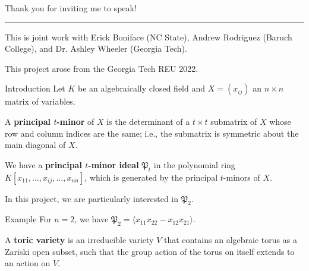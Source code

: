 \documentclass[mathserif,handout]{beamer}
\title
{\color{GTblue}{Toric varieties given by principal 2-minor ideals}}
\subtitle{Undergraduate Mathematics Research Symposium 2023}
\author[Sai Sivakumar]
{Sai Sivakumar}
\institute[Georgia Tech]{\color{GTtechgold}{University of Florida}}
\date{28 April 2023}
\newcommand{\pr}{\mathfrak P}
\begin{document}
\frame{\titlepage}

\begin{frame}{}{}
{\color{GTtechgold}Thank you for inviting me to speak!}
\vspace{0.75pc}
\hrule
\vspace{0.75pc}
This is joint work with Erick Boniface (NC State), Andrew Rodriguez (Baruch College), and Dr. Ashley Wheeler (Georgia Tech).

\vspace{0.75pc}
This project arose from the Georgia Tech REU 2022. 
\end{frame}


\begin{frame}{Introduction}
Let $K$ be an algebraically closed field and $X=(x_{ij})$ an $n\times n$ matrix of variables.


\vspace{0.75pc} 
\begin{definition}
    A \textbf{principal $t$-minor} of $X$ is the determinant of a $t\times t$ submatrix of $X$ whose row and column indices are the same; i.e., the submatrix is symmetric about the main diagonal of $X$.
\end{definition}

We have a \textbf{principal $t$-minor ideal} $\pr_t$ in the polynomial ring $K[x_{11},\dots,x_{ij},\dots,x_{nn}]$, which is generated by the principal $t$-minors of $X$. 
\end{frame}

\begin{frame}
In this project, we are particularly interested in $\pr_2$.

\vspace{0.75pc}
\begin{block}{Example}
    For $n =2$, we have $\pr_2 = \langle x_{11}x_{22}-x_{12}x_{21}\rangle$.
\end{block}

\vspace{0.75pc}
\begin{definition}
    A \textbf{toric variety} is an irreducible variety $V$ that contains an algebraic torus as a Zariski open subset, such that the group action of the torus on itself extends to an action on $V$.
\end{definition}

\end{frame}
\end{document}
